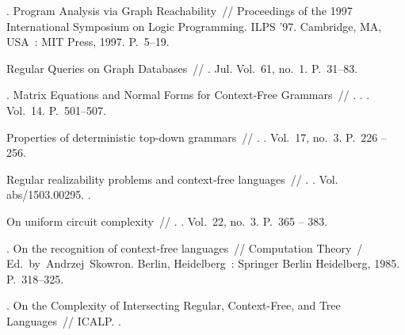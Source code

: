 \begin{thebibliography}{10}
. Program Analysis via Graph Reachability~// Proceedings
  of the 1997 International Symposium on Logic Programming. \BibDash
\newblock ILPS '97. \BibDash
\newblock Cambridge, MA, USA~: MIT Press, 1997. \BibDash
\newblock P.~5--19.

 Regular Queries on
  Graph Databases~//
  \href{http://dx.doi.org/10.1007/s00224-016-9676-2}{} \BibDash
{}. \BibDash Jul. \BibDash
\newblock Vol.~61, no.~1. \BibDash
\newblock P.~31--83.

. Matrix Equations and Normal Forms for
  Context-Free Grammars~//
  \href{http://dx.doi.org/10.1145/321406.321412}{}. \BibDash
{}. . \BibDash
\newblock Vol.~14. \BibDash
\newblock P.~501--507.

 Properties of deterministic top-down
  grammars~//
  \href{http://dx.doi.org/10.1016/S0019-9958(70)90446-8}{}. \BibDash
{}. \BibDash
\newblock Vol.~17, no.~3. \BibDash
\newblock P.~226 -- 256.

 Regular realizability
  problems and context-free languages~// . \BibDash
{}. \BibDash
\newblock Vol. abs/1503.00295. \BibDash
{}.

 On uniform circuit complexity~//
  \href{http://dx.doi.org/10.1016/0022-0000(81)90038-6}{}. \BibDash
{}. \BibDash
\newblock Vol.~22, no.~3. \BibDash
\newblock P.~365 -- 383.

. On the recognition of context-free languages~//
  Computation Theory~/ Ed.\ by\ Andrzej~Skowron. \BibDash
\newblock Berlin, Heidelberg~: Springer Berlin Heidelberg, 1985. \BibDash
\newblock P.~318--325.

. On the Complexity of Intersecting
  Regular, Context-Free, and Tree Languages~// ICALP. \BibDash
{}.


\end{thebibliography}
